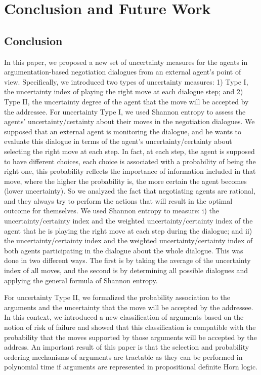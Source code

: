 \setcounter{chapter}{4}

\chapter{Conclusion and Future Work}

\section{Conclusion}\label{sec:conclusion}
In this paper, we proposed a new set of uncertainty measures for the agents in argumentation-based negotiation dialogues from an
external agent's point of view. Specifically, we introduced two types of uncertainty measures: 1) Type I, the uncertainty index of
playing the right move at each dialogue step; and 2) Type II, the uncertainty degree of the agent that the move will be accepted by
the addressee.
For uncertainty Type I, we used Shannon entropy to assess the agents' uncertainty/certainty about their moves in the negotiation
dialogues. We supposed that an external agent is monitoring the dialogue, and he wants to evaluate this dialogue in terms of the
agent's uncertainty/certainty about selecting the right move at each step. In fact, at each step, the agent is supposed to have
different choices, each choice is associated with a probability of being the right one, %
this probability reflects the importance of information included in that move, where the higher the probability is, the
more certain the agent becomes (lower uncertainty). So we analyzed the fact that negotiating agents are rational, and they always
try to perform the actions that will result in the optimal outcome for themselves. We used Shannon entropy to measure: i) the
uncertainty/certainty index and the weighted uncertainty/certainty index of the agent that he is playing the right move at each
step during the dialogue; and ii) the uncertainty/certainty index and the weighted uncertainty/certainty index of both agents
participating in the dialogue about the whole dialogue. This was done in two different ways. The first is by taking the average of
the uncertainty index of all moves, and the second is by determining all possible dialogues and applying the general formula of Shannon entropy.

For uncertainty Type II, we formalized the probability association to the arguments and the uncertainty that the move will be
accepted by the addressee. In this context, we introduced a new classification of arguments based on the notion of risk of failure
and showed that this classification is compatible with the probability that the moves supported by those arguments will be
accepted by the address. An important result of this paper is that the selection and probability ordering mechanisms of arguments
are tractable as they can be performed in polynomial time if arguments are represented in propositional definite Horn logic.

